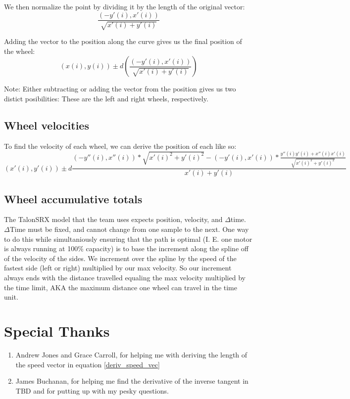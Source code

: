 \documentclass[12pt, english]{article}
\begin{document}
\noindent
We then normalize the point by dividing it by the length of the original vector: \\
\begin{equation}
	\label{deriv_speed_vec}
	\frac{(-y'(i), x'(i))}{\sqrt{x'(i)+y'(i)}}
\end{equation}

\noindent
Adding the vector to the position along the curve gives us the final position of the wheel:
\begin{equation}
	(x(i), y(i)) \pm d \left(\frac{(-y'(i), x'(i))}{\sqrt{x'(i)+y'(i)}}\right)
\end{equation}

\noindent
Note: Either subtracting or adding the vector from the position gives us two distict posibilities: These are the left and right wheels, respectively.

\subsection{Wheel velocities}
To find the velocity of each wheel, we can derive the position of each like so:
\begin{equation}
	(x'(i), y'(i)) \pm d\frac{(-y''(i), x''(i))*\sqrt{x'(i)^2+y'(i)^2} - (-y'(i), x'(i)) * \frac{y''(i)y'(i) + x''(i)x'(i)}{\sqrt{x'(i)^2+y'(i)^2}}}{x'(i)+y'(i)}
\end{equation}

\subsection{Wheel accumulative totals}
The TalonSRX model that the team uses expects position, velocity, and $\Delta$time. $\Delta$Time must be fixed, and cannot change from one sample to the next. One way to do this while simultaniously ensuring that the path is optimal (I. E. one motor is always running at 100\% capacity) is to base the increment along the spline off of the velocity of the sides. We increment over the spline by the speed of the fastest side (left or right) multiplied by our max velocity. So our increment always ends with the distance travelled equaling the max velocity multiplied by the time limit, AKA the maximum distance one wheel can travel in the time unit.

\section{Special Thanks}
\begin{enumerate}
	\item Andrew Jones and Grace Carroll, for helping me with deriving the length of the speed vector in equation \ref{deriv_speed_vec}
	\item James Buchanan, for helping me find the derivative of the inverse tangent in TBD and for putting up with my pesky questions.
\end{enumerate}
\end{document}
